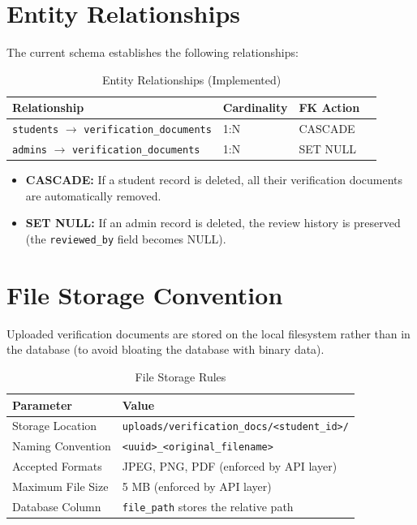 \documentclass[12pt,a4paper]{article}
\begin{document}
\section{Entity Relationships}

The current schema establishes the following relationships:

\begin{table}[h!]
\centering
\caption{Entity Relationships (Implemented)}
\begin{tabular}{@{}llll@{}}
\toprule
\textbf{Relationship}                          & \textbf{Cardinality} & \textbf{FK Action}  \\ \midrule
\texttt{students} $\rightarrow$ \texttt{verification\_documents} & 1:N     & CASCADE  \\
\texttt{admins} $\rightarrow$ \texttt{verification\_documents}   & 1:N     & SET NULL \\
\bottomrule
\end{tabular}
\end{table}

\begin{itemize}[noitemsep]
    \item \textbf{CASCADE:} If a student record is deleted, all their verification documents are automatically removed.
    \item \textbf{SET NULL:} If an admin record is deleted, the review history is preserved (the \texttt{reviewed\_by} field becomes NULL).
\end{itemize}

\section{File Storage Convention}

Uploaded verification documents are stored on the local filesystem rather than in the database (to avoid bloating the database with binary data).

\begin{table}[h!]
\centering
\caption{File Storage Rules}
\begin{tabular}{@{}ll@{}}
\toprule
\textbf{Parameter}       & \textbf{Value}                                              \\ \midrule
Storage Location         & \texttt{uploads/verification\_docs/<student\_id>/}           \\
Naming Convention        & \texttt{<uuid>\_<original\_filename>}                        \\
Accepted Formats         & JPEG, PNG, PDF (enforced by API layer)                      \\
Maximum File Size        & 5 MB (enforced by API layer)                                \\
Database Column          & \texttt{file\_path} stores the relative path                 \\
\bottomrule
\end{tabular}
\end{table}
\end{document}
